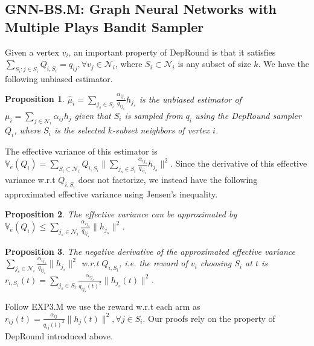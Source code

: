 \documentclass{article}
\newtheorem{proposition}{Proposition}
\begin{document}
\subsection{GNN-BS.M: Graph Neural Networks with Multiple Plays Bandit Sampler}\label{sec:bsm}


Given a vertex $v_i$, an important property of DepRound is that
it satisfies 
$\sum_{S_i:j\in S_i}Q_{i,S_i}=q_{ij}, \forall v_j\in\mathcal{N}_i$, 
where $S_i \subset \mathcal{N}_i$ is any subset of size $k$.
We have the following unbiased estimator.

\begin{proposition}\label{proposition:estimator2}
$\hat{\mu}_i = \sum_{j_s\in S_i}\frac{\alpha_{ij_s}}{q_{ij_s}}h_{j_s}$ 
is the unbiased estimator of $\mu_i=\sum_{j\in\mathcal{N}_i}\alpha_{ij}h_j$ 
given that $S_i$ is sampled from $q_i$ using the DepRound 
sampler $Q_{i}$, where $S_i$ is 
the selected $k$-subset neighbors of vertex $i$.
\end{proposition}
The effective variance of this estimator is 
$\mathbb{V}_e(Q_i) = \sum_{S_i\subset \mathcal{N}_i} Q_{i,S_i}\|\sum_{j_s \in S_i} \frac{\alpha_{ij_s}}{q_{ij_s}}h_{j_s}\|^2$.
Since the derivative of this effective variance w.r.t
$Q_{i,S_i}$ does not factorize, we instead have 
the following approximated effective variance 
using Jensen's inequality.
\begin{proposition}\label{proposition:mp_var_bound}
The effective variance can be approximated by $\mathbb{V}_e(Q_i) \leq \sum_{j_s \in \mathcal{N}_i} \frac{\alpha_{ij_s}}{q_{ij_s}}\|h_{j_s}\|^2$.
\end{proposition}
\begin{proposition}\label{proposition:mp_derivative}
The negative derivative of the approximated effective variance $\sum_{j_s \in \mathcal{N}_i} \frac{\alpha_{ij_s}}{q_{ij_s}}\|h_{j_s}\|^2$ w.r.t $Q_{i,S_i}$,
i.e. the reward of $v_i$ choosing $S_i$ at $t$ is
$r_{i,S_i}(t) = \sum_{j_s \in S_i} \frac{\alpha_{ij_s}}{q_{ij_s}(t)^2}\|h_{j_s}(t)\|^2$.
\end{proposition}
Follow EXP3.M we use the reward w.r.t each arm as 
$r_{ij}(t) = \frac{\alpha_{ij}}{q_{ij}(t)^2}\|h_{j}(t)\|^2,
\forall j\in S_i$.
Our proofs rely on the property of DepRound introduced above.


\begin{comment}
We describe our second training algorithm in Algorithm~\ref{alg:train_gnn}.
We sample the layers
in a top-down manner with DepRound. We calculate the unbiased estimator
using Proposition~\ref{proposition:estimator2}.
After we update the GNN model, we calculate the reward derived 
in Eq.~\eqref{eq:reward2}. Finally we update the sampling distribution based 
on Algorithm~\ref{alg:exp3m} (\textbf{EXP3.M}~\cite{uchiya2010algorithms}) 
in Appendix~\ref{appendix:alg}.
\end{comment}
\end{document}

